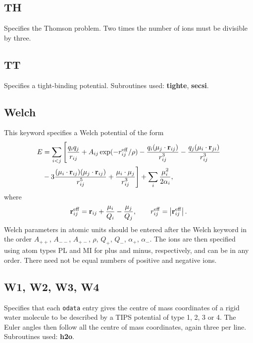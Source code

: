 \documentclass[12pt,a4paper,dvips]{article}
\newcommand{\D}{\displaystyle}
\begin{document}
\subsection{TH} Specifies the Thomson problem. Two times the number of ions
must be divisible by three.

\subsection{TT} Specifies a tight-binding potential. 
Subroutines used: {\bf tighte}, {\bf secsi}.

\subsection{Welch}This keyword specifies a Welch potential\cite{welchld76,phillipscb91} of the form
\begin{eqnarray*}
E &= \sum_{i<j}\Bigg[ {\D q_i q_j\over\D  r_{ij}} + A_{ij}\exp(-r_{ij}^{\rm eff}/\rho) 
              -{\D q_i({\bf \mu}_j\cdot{\bf r}_{ij})\over\D  r_{ij}^3} 
              -{\D q_j({\bf \mu}_i\cdot{\bf r}_{ji})\over\D  r_{ij}^3} \\
             &-3{\D   ({\bf \mu}_i\cdot{\bf r}_{ij})
                   ({\bf \mu}_j\cdot{\bf r}_{ij})\over\D  r_{ij}^5} 
              +{\D  {\bf \mu}_i\cdot{\bf \mu}_j\over\D  r_{ij}^3}\Bigg] 
              +\sum_i {\D \mu_i^2\over\D 2\alpha_i}, \\
\end{eqnarray*}
where 
$$ {\bf r}_{ij}^{\rm eff}={\bf r}_{ij}+{{\bf\mu}_i\over Q_i}-{{\bf \mu}_j\over Q_j}, 
    \qquad r_{ij}^{\rm eff}=\left|{\bf r}_{ij}^{\rm eff}\right|. $$
Welch parameters in atomic units should be
entered after the Welch keyword in the order $A_{++}$, $A_{--}$, $A_{+-}$, $\rho$, $Q_+$,
$Q_-$, $\alpha_+$, $\alpha_-$.
The ions are then specified using atom types PL and MI for plus and minus, respectively,
and can be in any order. There need not be equal numbers of positive and negative ions.

\subsection{W1, W2, W3, W4}Specifies that each {\tt odata} entry gives the centre of mass coordinates
of a rigid water molecule to be described by a TIPS potential\cite{jorgensen81} of type 1, 2, 3 or 4.
The Euler angles then follow all the centre of mass coordinates, again three per line.
Subroutines used: {\bf h2o}.
\end{document}
